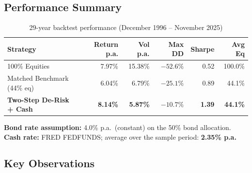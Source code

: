 \documentclass[11pt, a4paper]{article}
\begin{document}
\subsection{Performance Summary}

\begin{table}[H]
\centering
\caption{29-year backtest performance (December 1996 -- November 2025)}
\label{tab:perf}
\begin{tabular}{lrrrrr}
\toprule
\textbf{Strategy} & \textbf{Return p.a.} & \textbf{Vol p.a.} & \textbf{Max DD} & \textbf{Sharpe} & \textbf{Avg Eq} \\
\midrule
100\% Equities                & 7.97\% & 15.38\% & $-52.6\%$ & 0.52 & 100.0\% \\
Matched Benchmark (44\% eq)   & 6.04\% &  6.79\% & $-25.1\%$ & 0.89 &  44.1\% \\
\textbf{Two-Step De-Risk + Cash} & \textbf{8.14\%} & \textbf{5.87\%} & $\mathbf{-10.7\%}$ & \textbf{1.39} & \textbf{44.1\%} \\
\bottomrule
\end{tabular}
\end{table}

\noindent
\textbf{Bond rate assumption:} 4.0\% p.a.\ (constant) on the 50\% bond allocation.\\
\textbf{Cash rate:} FRED FEDFUNDS; average over the sample period: \textbf{2.35\% p.a.}

\subsection{Key Observations}
\end{document}
